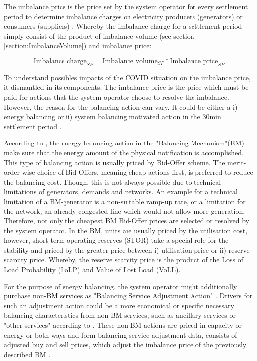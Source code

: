 \documentclass[energies,article,submit,moreauthors,pdftex]{Definitions/mdpi}
\begin{document}
The imbalance price is the price set by the system operator for every settlement period to determine imbalance charges on electricity producers (generators) or consumers (suppliers) \cite{ELEXON2019GuidanceBritain}. Whereby the imbalance charge for a settlement period simply consist of the product of imbalance volume (see section \ref{section:ImbalanceVolume}) and imbalance price:

\[ \text{Imbalance charge}_{SP} = \text{Imbalance volume}_{SP} * \text{Imbalance price}_{SP} \]

To understand possibles impacts of the COVID situation on the imbalance price, it dismantled in its components. The imbalance price is the price which must be paid for actions that the system operator choose to resolve the imbalance. However, the reason for the balancing action can vary. It could be either a i) energy balancing or ii) system balancing motivated action in the 30min settlement period \cite{ELEXON2019GuidanceBritain}. 

According to \cite{ELEXON2019GuidanceBritain}, the energy balancing action in the "Balancing Mechanism"(BM) make sure that the energy amount of the physical notification is accomplished. This type of balancing action is usually priced by Bid-Offer scheme. The merit-order wise choice of Bid-Offers, meaning cheap actions first, is preferred to reduce the balancing cost. Though, this is not always possible due to technical limitations of generators, demands and networks. An example for a technical limitation of a BM-generator is a non-suitable ramp-up rate, or a limitation for the network, an already congested line which would not allow more generation. Therefore, not only the cheapest BM Bid-Offer prices are selected or resolved by the system operator. In the BM, units are usually priced by the utilisation cost, however, short term operating reserves (STOR) take a special role for the stability and priced by the greater price between i) utilisation price or ii) reserve scarcity price. Whereby, the reserve scarcity price is the product of the Loss of Load Probability (LoLP) and Value of Lost Load (VoLL). 

For the purpose of energy balancing, the system operator might additionally purchase non-BM services as "Balancing Service Adjustment Action" \cite{Nationalgrid2017ProcurementSO}. Drivers for such an adjustment action could be a more economical or specific necessary balancing characteristics from non-BM services, such as ancillary services or "other services" according to \cite{Nationalgrid2018BalancingStatement}. These non-BM actions are priced in capacity or energy or both ways and form balancing service adjustment data, consists of adjusted buy and sell prices, which adjust the imbalance price of the previously described BM \cite{Nationalgrid2017ProcurementSO,Nationalgrid2018BalancingStatement}.
\end{document}

